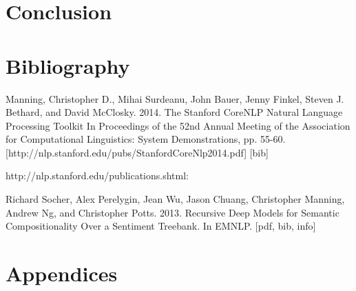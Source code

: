 \documentclass[11pt]{article}
\begin{document}

\section{Conclusion}


\section{Bibliography}




Manning, Christopher D., Mihai Surdeanu, John Bauer, Jenny Finkel, Steven J. Bethard, and David McClosky. 2014. The Stanford CoreNLP Natural Language Processing Toolkit In Proceedings of the 52nd Annual Meeting of the Association for Computational Linguistics: System Demonstrations, pp. 55-60. [http://nlp.stanford.edu/pubs/StanfordCoreNlp2014.pdf] [bib]

http://nlp.stanford.edu/publications.shtml:

Richard Socher, Alex Perelygin, Jean Wu, Jason Chuang, Christopher Manning, Andrew Ng, and Christopher Potts. 2013. Recursive Deep Models for Semantic Compositionality Over a Sentiment Treebank. In EMNLP. [pdf, bib, info]

\section{Appendices}
\end{document}

